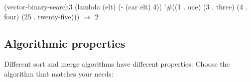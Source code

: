 \begin{example}
(vector-binary-search3 (lambda (elt) (- (car elt) 4))
                       '\#((1 . one) (3 . three)
                          (4 . four) (25 . twenty-five)))
\(\Longrightarrow\) 2
\end{example}


\subsection{Algorithmic properties}

Different sort and merge algorithms have different properties.
Choose the algorithm that matches your needs:

